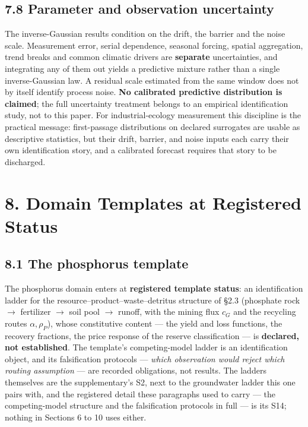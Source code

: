 \documentclass[11pt]{article}
\begin{document}
\subsection*{7.8 Parameter and observation uncertainty}\label{78-parameter-and-observation-uncertainty}

The inverse-Gaussian results condition on the drift, the barrier and the noise scale. Measurement error, serial dependence, seasonal forcing, spatial aggregation, trend breaks and common climatic drivers are \textbf{separate} uncertainties, and integrating any of them out yields a predictive mixture rather than a single inverse-Gaussian law. A residual scale estimated from the same window does not by itself identify process noise. \textbf{No calibrated predictive distribution is claimed}; the full uncertainty treatment belongs to an empirical identification study, not to this paper. For industrial-ecology measurement this discipline is the practical message: first-passage distributions on declared surrogates are usable as descriptive statistics, but their drift, barrier, and noise inputs each carry their own identification story, and a calibrated forecast requires that story to be discharged.

\vspace{0.8em}

\section*{8. Domain Templates at Registered Status}\label{8-domain-templates-at-registered-status}

\subsection*{8.1 The phosphorus template}\label{81-the-phosphorus-template}

The phosphorus domain enters at \textbf{registered template status}: an identification ladder for the resource--product--waste--detritus structure of \S2.3 (phosphate rock \(\to\) fertilizer \(\to\) soil pool \(\to\) runoff, with the mining flux \(c_G\) and the recycling routes \(\alpha,\rho_P\)), whose constitutive content --- the yield and loss functions, the recovery fractions, the price response of the reserve classification --- is \textbf{declared, not established}. The template's competing-model ladder is an identification object, and its falsification protocols --- \emph{which observation would reject which routing assumption} --- are recorded obligations, not results. The ladders themselves are the supplementary's S2, next to the groundwater ladder this one pairs with, and the registered detail these paragraphs used to carry --- the competing-model structure and the falsification protocols in full --- is its S14; nothing in Sections 6 to 10 uses either.
\end{document}
